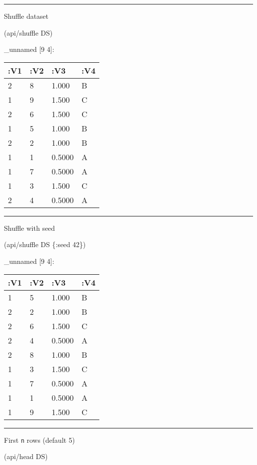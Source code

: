 \documentclass[]{article}
\newenvironment{Shaded}{\begin{snugshade}}{\end{snugshade}}
\newcommand{\DecValTok}[1]{\textcolor[rgb]{0.00,0.00,0.81}{#1}}
\newcommand{\AttributeTok}[1]{\textcolor[rgb]{0.77,0.63,0.00}{#1}}
\newcommand{\NormalTok}[1]{#1}
\begin{document}
\begin{center}\rule{0.5\linewidth}{0.5pt}\end{center}

Shuffle dataset

\begin{Shaded}
\begin{Highlighting}[]
\NormalTok{(api/shuffle DS)}
\end{Highlighting}
\end{Shaded}

\_unnamed {[}9 4{]}:

\begin{longtable}[]{@{}llll@{}}
\toprule
:V1 & :V2 & :V3 & :V4\tabularnewline
\midrule
\endhead
2 & 8 & 1.000 & B\tabularnewline
1 & 9 & 1.500 & C\tabularnewline
2 & 6 & 1.500 & C\tabularnewline
1 & 5 & 1.000 & B\tabularnewline
2 & 2 & 1.000 & B\tabularnewline
1 & 1 & 0.5000 & A\tabularnewline
1 & 7 & 0.5000 & A\tabularnewline
1 & 3 & 1.500 & C\tabularnewline
2 & 4 & 0.5000 & A\tabularnewline
\bottomrule
\end{longtable}

\begin{center}\rule{0.5\linewidth}{0.5pt}\end{center}

Shuffle with seed

\begin{Shaded}
\begin{Highlighting}[]
\NormalTok{(api/shuffle DS \{}\AttributeTok{:seed} \DecValTok{42}\NormalTok{\})}
\end{Highlighting}
\end{Shaded}

\_unnamed {[}9 4{]}:

\begin{longtable}[]{@{}llll@{}}
\toprule
:V1 & :V2 & :V3 & :V4\tabularnewline
\midrule
\endhead
1 & 5 & 1.000 & B\tabularnewline
2 & 2 & 1.000 & B\tabularnewline
2 & 6 & 1.500 & C\tabularnewline
2 & 4 & 0.5000 & A\tabularnewline
2 & 8 & 1.000 & B\tabularnewline
1 & 3 & 1.500 & C\tabularnewline
1 & 7 & 0.5000 & A\tabularnewline
1 & 1 & 0.5000 & A\tabularnewline
1 & 9 & 1.500 & C\tabularnewline
\bottomrule
\end{longtable}

\begin{center}\rule{0.5\linewidth}{0.5pt}\end{center}

First \texttt{n} rows (default 5)

\begin{Shaded}
\begin{Highlighting}[]
\NormalTok{(api/head DS)}
\end{Highlighting}
\end{Shaded}
\end{document}
